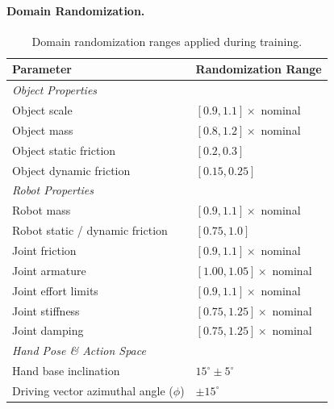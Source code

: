 \paragraph{Domain Randomization.}

\begin{table}[h]
\centering
\caption{Domain randomization ranges applied during training.}
\label{tab:domain_randomization}
\vspace{-2mm}
\small
\begin{tabular}{ll}
\toprule
\textbf{Parameter}                              & \textbf{Randomization Range}          \\
\midrule
\multicolumn{2}{l}{\textit{Object Properties}} \\
\midrule
Object scale                                    & $[0.9, 1.1] \times$ nominal         \\
Object mass                                     & $[0.8, 1.2] \times$ nominal         \\
Object static friction                          & $[0.2, 0.3]$                        \\
Object dynamic friction                         & $[0.15, 0.25]$                      \\
\midrule
\multicolumn{2}{l}{\textit{Robot Properties}} \\
\midrule
Robot mass                                      & $[0.9, 1.1] \times$ nominal         \\
Robot static / dynamic friction                 & $[0.75, 1.0]$                       \\
Joint friction                                  & $[0.9, 1.1] \times$ nominal         \\
Joint armature                                  & $[1.00, 1.05] \times$ nominal       \\
Joint effort limits                             & $[0.9, 1.1] \times$ nominal         \\
Joint stiffness                                 & $[0.75, 1.25] \times$ nominal       \\
Joint damping                                   & $[0.75, 1.25] \times$ nominal       \\
\midrule
\multicolumn{2}{l}{\textit{Hand Pose \& Action Space}} \\
\midrule
Hand base inclination                           & $15^\circ \pm 5^\circ$              \\
Driving vector azimuthal angle ($\phi$)         & $\pm 15^\circ$                      \\
\bottomrule
\end{tabular}
\vspace{-2mm}
\end{table}

